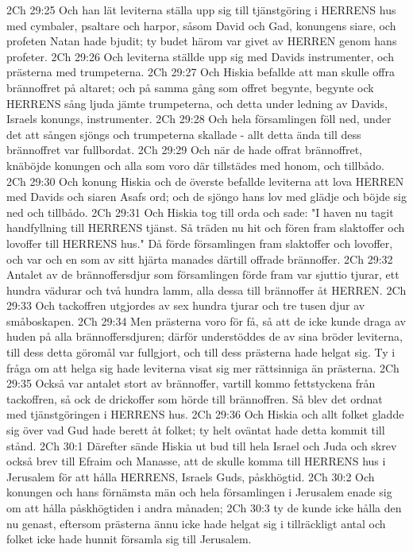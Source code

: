 2Ch 29:25  Och han lät leviterna ställa upp sig till tjänstgöring i HERRENS hus med cymbaler, psaltare och harpor, såsom David och Gad, konungens siare, och profeten Natan hade bjudit; ty budet härom var givet av HERREN genom hans profeter.
2Ch 29:26  Och leviterna ställde upp sig med Davids instrumenter, och prästerna med trumpeterna.
2Ch 29:27  Och Hiskia befallde att man skulle offra brännoffret på altaret; och på samma gång som offret begynte, begynte ock HERRENS sång ljuda jämte trumpeterna, och detta under ledning av Davids, Israels konungs, instrumenter.
2Ch 29:28  Och hela församlingen föll ned, under det att sången sjöngs och trumpeterna skallade - allt detta ända till dess brännoffret var fullbordat.
2Ch 29:29  Och när de hade offrat brännoffret, knäböjde konungen och alla som voro där tillstädes med honom, och tillbådo.
2Ch 29:30  Och konung Hiskia och de överste befallde leviterna att lova HERREN med Davids och siaren Asafs ord; och de sjöngo hans lov med glädje och böjde sig ned och tillbådo.
2Ch 29:31  Och Hiskia tog till orda och sade: "I haven nu tagit handfyllning till HERRENS tjänst. Så träden nu hit och fören fram slaktoffer och lovoffer till HERRENS hus." Då förde församlingen fram slaktoffer och lovoffer, och var och en som av sitt hjärta manades därtill offrade brännoffer.
2Ch 29:32  Antalet av de brännoffersdjur som församlingen förde fram var sjuttio tjurar, ett hundra vädurar och två hundra lamm, alla dessa till brännoffer åt HERREN.
2Ch 29:33  Och tackoffren utgjordes av sex hundra tjurar och tre tusen djur av småboskapen.
2Ch 29:34  Men prästerna voro för få, så att de icke kunde draga av huden på alla brännoffersdjuren; därför understöddes de av sina bröder leviterna, till dess detta göromål var fullgjort, och till dess prästerna hade helgat sig. Ty i fråga om att helga sig hade leviterna visat sig mer rättsinniga än prästerna.
2Ch 29:35  Också var antalet stort av brännoffer, vartill kommo fettstyckena från tackoffren, så ock de drickoffer som hörde till brännoffren. Så blev det ordnat med tjänstgöringen i HERRENS hus.
2Ch 29:36  Och Hiskia och allt folket gladde sig över vad Gud hade berett åt folket; ty helt oväntat hade detta kommit till stånd.
2Ch 30:1  Därefter sände Hiskia ut bud till hela Israel och Juda och skrev också brev till Efraim och Manasse, att de skulle komma till HERRENS hus i Jerusalem för att hålla HERRENS, Israels Guds, påskhögtid.
2Ch 30:2  Och konungen och hans förnämsta män och hela församlingen i Jerusalem enade sig om att hålla påskhögtiden i andra månaden;
2Ch 30:3  ty de kunde icke hålla den nu genast, eftersom prästerna ännu icke hade helgat sig i tillräckligt antal och folket icke hade hunnit församla sig till Jerusalem.
